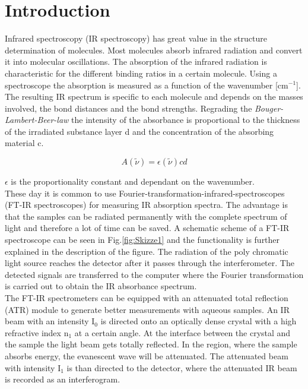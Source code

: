 \documentclass[a4paper,abstracton]{article}	                       %
\renewcommand{\cite}{\supercite}						%
\begin{document}
\pagestyle{fancy} \renewcommand{\headrulewidth}{0.5pt}



\section*{Introduction}
Infrared spectroscopy (IR spectroscopy) has great value in the structure determination of molecules. Most molecules absorb infrared radiation and convert it into molecular oscillations. The absorption of the infrared radiation is characteristic for the different binding ratios in a certain molecule. Using a spectroscope the absorption is measured as a function of the wavenumber [cm$^{-1}$]\cite{bruker}. The resulting IR spectrum is specific to each molecule and depends on the masses involved, the bond distances and the bond strengths. Regrading the \textit{Bouger-Lambert-Beer-law} the intensity of the absorbance is proportional to the thickness of the irradiated substance layer d and the concentration of the absorbing material c.

\begin{equation}\label{eq:A(nu)}
   {A(\tilde{\nu})} = \epsilon(\tilde{\nu})cd
\end{equation}

$\epsilon$ is the proportionality constant and dependant on the wavenumber\cite{meister}. \\

These day it is common to use Fourier-transformation-infrared-spectroscopes (FT-IR spectroscopes) for measuring IR absorption spectra. The advantage is that the samples can be radiated permanently with the complete spectrum of light and therefore a lot of time can be saved\cite{meister}. A schematic scheme of a FT-IR spectroscope can be seen in Fig.\ref{fig:Skizze1} and the functionality is further explained in the description of the figure. The radiation of the poly chromatic light source reaches the detector after it passes through the interferometer. The detected signals are transferred to the computer where the Fourier transformation is carried out to obtain the IR absorbance spectrum\cite{FTIR}.\\

The FT-IR spectrometers can be equipped with an attenuated total reflection (ATR) module to generate better measurements with aqueous samples\cite{meister}. An IR beam with an intensity I$_{0}$ is directed onto an optically dense crystal with a high refractive index n$_{1}$ at a certain angle. At the interface between the crystal and the sample the light beam gets totally reflected. In the region, where the sample absorbs energy, the evanescent wave will be attenuated. The attenuated beam with intensity I$_{1}$ is than directed to the detector, where the attenuated IR beam is recorded as an interferogram\cite{ATR}. \\
\end{document}
